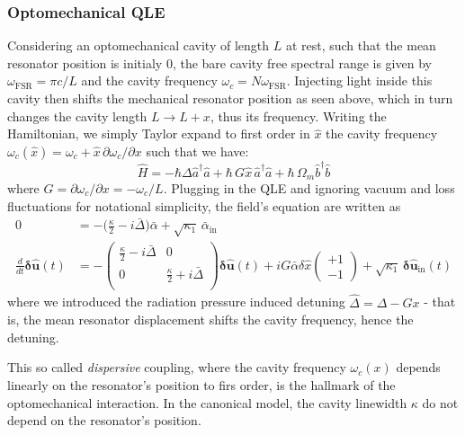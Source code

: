 \subsubsection{Optomechanical QLE}
Considering an optomechanical cavity of length $L$ at rest, such that the mean resonator position is initialy 0, the bare cavity free spectral range is given by $\omega_{\mathrm{FSR}}=\pi c /L$ and the cavity frequency $\omega_c = N \omega_{\mathrm{FSR}}$. Injecting light inside this cavity then shifts the mechanical resonator position as seen above, which in turn changes the cavity length $L \rightarrow L+x$, thus its frequency. Writing the Hamiltonian, we simply Taylor expand to first order in $\hat{x}$ the cavity frequency $\omega_c(\hat{x})=\omega_c + \hat x \, \partial \omega_c / \partial x$ such that we have: 
\begin{equation}
\hat{H} = - \hbar \Delta  \hat{a}^\dagger \hat{a} + \hbar \, G  \hat{x} \, \hat{a}^{\dagger} \hat{a} + \hbar \, \Omega_m \hat{b}^\dagger \hat{b}
\end{equation}
where $G=  \partial \omega_c / \partial x = - \omega_c/L$. 
Plugging in the QLE and ignoring vacuum and loss fluctuations for notational simplicity, the field's equation are written as 
\begin{equation}
  \begin{split}
  0 &= -\Big(\frac{\kappa}{2}-i\bar\Delta\Big) \bar{\alpha} + \sqrt{\kappa_1} \, \bar{\alpha}_{\mathrm{in}} \\
  \frac{d}{dt} \mathbf{\delta \hat{u}}(t)&= - \begin{pmatrix}
  \frac{\kappa}{2}-i\bar\Delta & 0 \\ 
   0 & \frac{\kappa}{2}+i\bar\Delta \\ 
  \end{pmatrix}  \mathbf{\delta \hat{u}}(t) + iG\bar{\alpha}\delta \hat{x} \begin{pmatrix} +1 \\ -1\end{pmatrix}  +  \sqrt{\kappa_{\mathrm{1}}} \, \mathbf{\delta \hat{u}_{\mathrm{in}}}(t) 
  \end{split}
\end{equation}
where we introduced the radiation pressure induced detuning $\hat\Delta = \Delta - G x$ - that is, the mean resonator displacement shifts the cavity frequency, hence the detuning. 

This so called \textit{dispersive} coupling, where the cavity frequency $\omega_c(x)$ depends linearly on the resonator's position to firs order, is the hallmark of the optomechanical interaction. In the canonical model, the cavity linewidth $\kappa$ do not depend on the resonator's position. 


